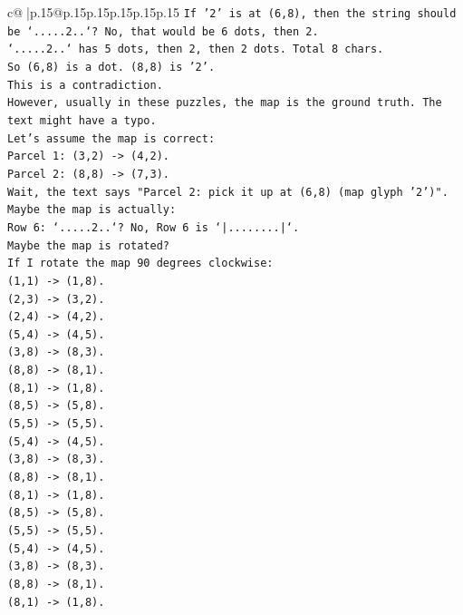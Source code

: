 \documentclass{article}
\begin{document}
{\begin{supertabular}{c@{$\;$}|p{.15\linewidth}@{}p{.15\linewidth}p{.15\linewidth}p{.15\linewidth}p{.15\linewidth}p{.15\linewidth}}
{{{\texttt{If '2' is at (6,8), then the string should be `.....2..`? No, that would be 6 dots, then 2.} \\
\texttt{`.....2..` has 5 dots, then 2, then 2 dots. Total 8 chars.} \\
\texttt{So (6,8) is a dot. (8,8) is '2'.} \\
\texttt{This is a contradiction.} \\
\texttt{However, usually in these puzzles, the map is the ground truth. The text might have a typo.} \\
\texttt{Let's assume the map is correct:} \\
\texttt{Parcel 1: (3,2) {-}> (4,2).} \\
\texttt{Parcel 2: (8,8) {-}> (7,3).} \\
\texttt{Wait, the text says "Parcel 2: pick it up at (6,8) (map glyph '2')".} \\
\texttt{Maybe the map is actually:} \\
\texttt{Row 6: `.....2..`? No, Row 6 is `|........|`.} \\
\texttt{Maybe the map is rotated?} \\
\texttt{If I rotate the map 90 degrees clockwise:} \\
\texttt{(1,1) {-}> (1,8).} \\
\texttt{(2,3) {-}> (3,2).} \\
\texttt{(2,4) {-}> (4,2).} \\
\texttt{(5,4) {-}> (4,5).} \\
\texttt{(3,8) {-}> (8,3).} \\
\texttt{(8,8) {-}> (8,1).} \\
\texttt{(8,1) {-}> (1,8).} \\
\texttt{(8,5) {-}> (5,8).} \\
\texttt{(5,5) {-}> (5,5).} \\
\texttt{(5,4) {-}> (4,5).} \\
\texttt{(3,8) {-}> (8,3).} \\
\texttt{(8,8) {-}> (8,1).} \\
\texttt{(8,1) {-}> (1,8).} \\
\texttt{(8,5) {-}> (5,8).} \\
\texttt{(5,5) {-}> (5,5).} \\
\texttt{(5,4) {-}> (4,5).} \\
\texttt{(3,8) {-}> (8,3).} \\
\texttt{(8,8) {-}> (8,1).} \\
\texttt{(8,1) {-}> (1,8).} \\
}}}
\end{supertabular}}
\end{document}
